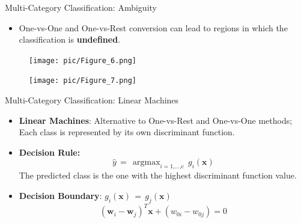 \documentclass[serif, aspectratio=169]{beamer}
\DeclareMathOperator*{\argmax}{argmax}
\begin{document}
    \begin{frame}{Multi-Category Classification: Ambiguity}
        \begin{itemize}
            \item \justifying One-vs-One and One-vs-Rest conversion can lead to regions in which the classification is \textbf{undefined}.
        \end{itemize}
        \vfill
        \begin{figure}[bh]
            \centering
            \texttt{[image: pic/Figure\_6.png]}
        \end{figure}
        \endminipage
        \begin{figure}[bh]
            \centering
            \texttt{[image: pic/Figure\_7.png]}
        \end{figure}
        \endminipage
        \vfill
    \end{frame}


    \begin{frame}{Multi-Category Classification: Linear Machines}
        \begin{itemize}\itemsep1.5em
        \item \justifying \textbf{Linear Machines}: Alternative to One-vs-Rest and One-vs-One methods;
        Each class is represented by its own discriminant function.
        \item \justifying \textbf{Decision Rule:}
        \[\hat{y} \, = \, \argmax_{i=\text{1,...,c}} \, g_i(\mathbf{x})\]
        The predicted class is the one with the highest discriminant function value.
        \item \textbf{Decision Boundary}:
        \(g_i(\mathbf{x}) \, = \, g_j(\mathbf{x})\)
        \[(\mathbf{w}_i - \mathbf{w}_j)^T\mathbf{x} + (w_{0i} - w_{0j}) = 0\]
        \end{itemize}
    \end{frame}
\end{document}
